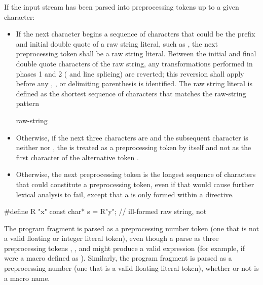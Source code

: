 \pnum
If the input stream has been parsed into preprocessing tokens up to a
given character:
\begin{itemize}
%
\item If the next character begins a sequence of characters that could be the prefix
and initial double quote of a raw string literal, such as , the next preprocessing
token shall be a raw string literal. Between the initial and final
double quote characters of the raw string, any transformations performed in phases
1 and 2 ( and line splicing) are reverted; this reversion
shall apply before any , , or delimiting
parenthesis is identified. The raw string literal is defined as the shortest sequence
of characters that matches the raw-string pattern

\begin{ncbnf}
  raw-string
\end{ncbnf}

\item Otherwise, if the next three characters are \tcode{<::} and the subsequent character
is neither \tcode{:} nor \tcode{>}, the \tcode{<} is treated as a preprocessing token by
itself and not as the first character of the alternative token \tcode{<:}.

\item Otherwise,
the next preprocessing token is the longest sequence of
characters that could constitute a preprocessing token, even if that
would cause further lexical analysis to fail,
except that a  is only formed
within a  directive.
\end{itemize}

\begin{example}
\begin{codeblock}
#define R "x"
const char* s = R"y";           // ill-formed raw string, not 
\end{codeblock}
\end{example}

\pnum
\begin{example} The program fragment  is parsed as a
preprocessing number token (one that is not a valid floating or integer
literal token), even though a parse as three preprocessing tokens
, \tcode{+}, and  might produce a valid expression (for example,
if  were a macro defined as ). Similarly, the
program fragment  is parsed as a preprocessing number (one
that is a valid floating literal token), whether or not  is a
macro name. \end{example}

